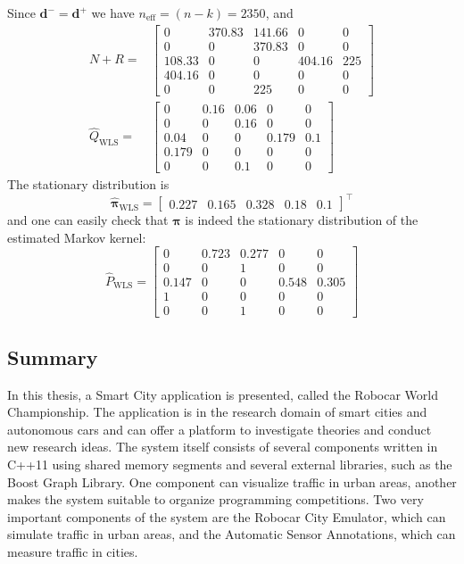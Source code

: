 \documentclass[b5paper,12pt]{report}
\theoremstyle{definition}
\newcommand{\bd}{\boldsymbol{d}}
\newcommand{\bpi}{\boldsymbol{\pi}}
\begin{document}
Since $\bd^{-} = \bd^{+}$ we have $n_{\textrm{eff}} = (n-k) = 2350$, and
\begin{equation*}
\begin{split}
    N+R = &\begin{bmatrix}   
    0 &  370.83 & 141.66 & 0 & 0 \\ 
    0 & 0 & 370.83 &  0 &  0 \\
    108.33  &  0 & 0 & 404.16 & 225  \\
    404.16 & 0 & 0 & 0 & 0 \\
    0  & 0 & 225 & 0 & 0  \end{bmatrix} \\
    \widehat{Q}_{\textrm{WLS}}  = & \begin{bmatrix}   
    0 &  0.16 & 0.06 & 0 & 0 \\ 0 & 0 & 0.16 &  0 &  0 \\
    0.04  &  0 & 0 & 0.179 &  0.1  \\ 0.179 &  0 & 0 & 0 & 0 \\
    0  & 0 & 0.1 & 0 & 0  \end{bmatrix}   
\end{split}
\end{equation*}   
The stationary distribution is
\[
    \widehat{\bpi}_{\textrm{WLS}} = \begin{bmatrix} 0.227 &  0.165 &  0.328 & 0.18 &  0.1 \end{bmatrix}^\top
\]
and one can easily check that $\bpi$ is indeed the stationary distribution of the estimated Markov kernel:
\[
\widehat{P}_{\textrm{WLS}} =  \begin{bmatrix} 
0 & 0.723 & 0.277 & 0 & 0 \\ 0 & 0 &  1 & 0 & 0 \\
0.147 & 0 & 0 & 0.548 & 0.305 \\ 1 & 0 & 0 & 0 & 0 \\
0 & 0 & 1 & 0 & 0 \end{bmatrix}
\]

\newpage
\subsection*{Summary}
In this thesis, a Smart City application is presented, called the Robocar World Championship. The application is in the research domain of smart cities and autonomous cars and can offer a platform to investigate theories and conduct new research ideas. The system itself consists of several components written in C++11 using shared memory segments and several external libraries, such as the Boost Graph Library. One component can visualize traffic in urban areas, another makes the system suitable to organize programming competitions. Two very important components of the system are the Robocar City Emulator, which can simulate traffic in urban areas, and the Automatic Sensor Annotations, which can measure traffic in cities.
\end{document}
